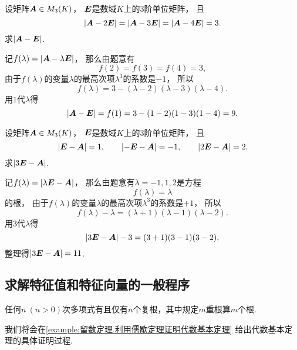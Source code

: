 \begin{example}
设矩阵\(\boldsymbol{A} \in M_3(K)\)，
\(\boldsymbol{E}\)是数域\(K\)上的3阶单位矩阵，
且\[
	\abs{\boldsymbol{A}-2\boldsymbol{E}}
	= \abs{\boldsymbol{A}-3\boldsymbol{E}}
	= \abs{\boldsymbol{A}-4\boldsymbol{E}}
	= 3.
\]
求\(\abs{\boldsymbol{A}-\boldsymbol{E}}\).
\begin{solution}
记\(f(\lambda) = \abs{\boldsymbol{A}-\lambda\boldsymbol{E}}\)，
那么由题意有\[
	f(2) = f(3) = f(4) = 3,
\]
由于\(f(\lambda)\)的变量\(\lambda\)的最高次项\(\lambda^3\)的系数是\(-1\)，
所以\[
	f(\lambda) = 3 - (\lambda-2)(\lambda-3)(\lambda-4).
\]
用\(1\)代\(\lambda\)得\[
	\abs{\boldsymbol{A}-\boldsymbol{E}}
	= f(1)
	= 3 - (1-2)(1-3)(1-4)
	= 9.
\]
\end{solution}
\end{example}
\begin{example}
设矩阵\(\boldsymbol{A} \in M_3(K)\)，
\(\boldsymbol{E}\)是数域\(K\)上的3阶单位矩阵，
且\[
	\abs{\boldsymbol{E}-\boldsymbol{A}} = 1,
	\qquad
	\abs{-\boldsymbol{E}-\boldsymbol{A}} = -1,
	\qquad
	\abs{2\boldsymbol{E}-\boldsymbol{A}} = 2.
\]
求\(\abs{3\boldsymbol{E}-\boldsymbol{A}}\).
\begin{solution}
记\(f(\lambda) = \abs{\lambda\boldsymbol{E}-\boldsymbol{A}}\)，
那么由题意有\(\lambda=-1,1,2\)是方程\[
	f(\lambda) = \lambda
\]的根，
由于\(f(\lambda)\)的变量\(\lambda\)的最高次项\(\lambda^3\)的系数是\(+1\)，
所以\[
	f(\lambda) - \lambda
	= (\lambda+1)(\lambda-1)(\lambda-2).
\]
用\(3\)代\(\lambda\)得\[
	\abs{3\boldsymbol{E}-\boldsymbol{A}} - 3
	= (3+1)(3-1)(3-2),
\]
整理得\(\abs{3\boldsymbol{E}-\boldsymbol{A}} = 11\).
\end{solution}
\end{example}

\subsection{求解特征值和特征向量的一般程序}
\begin{lemma}[代数基本定理]
任何\(n\ (n>0)\)次多项式有且仅有\(n\)个复根，其中规定\(m\)重根算\(m\)个根.
\end{lemma}
我们将会在\cref{example:留数定理.利用儒歇定理证明代数基本定理} 给出代数基本定理的具体证明过程.

